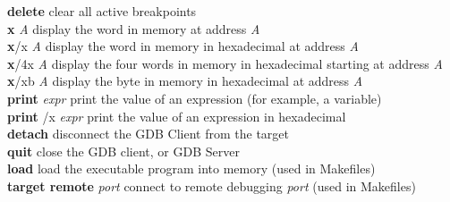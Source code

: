 \documentclass[11pt, twoside, pdftex]{article}
\newcommand{\commonPath}{../../Common}
\begin{document}
\begin{tabbing}
{\bf delete} \>clear all active breakpoints\\
{\bf x} {\it A} \>display the word in memory at address {\it A}\\
{\bf x}/x {\it A} \>display the word in memory in hexadecimal at address {\it A}\\
{\bf x}/4x {\it A} \>display the four words in memory in hexadecimal starting at address {\it A}\\
{\bf x}/xb {\it A} \>display the byte in memory in hexadecimal at address {\it A}\\
{\bf print} {\it expr} \>print the value of an expression (for example, a variable)\\
{\bf print} /x {\it expr} \>print the value of an expression in hexadecimal\\
{\bf detach} \>disconnect the GDB Client from the target\\
{\bf quit} \>close the GDB client, or GDB Server\\
{\bf load} \>load the executable program into memory (used in Makefiles)\\
{\bf target remote} {\it port} \>connect to remote debugging {\it port} (used in Makefiles)
\end{tabbing}



\end{document}
